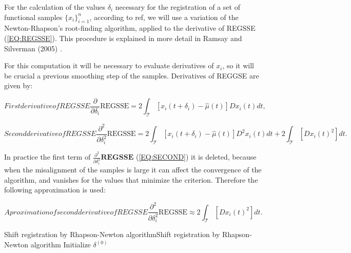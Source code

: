 

For the calculation of the values $\delta_i$ necessary for the registration of a
set of functional samples $\{x_i\}_{i=1}^{n}$, according to ref{},
we will use a variation of the Newton-Rhapson's root-finding algorithm, applied
to the derivative of REGSSE (\ref{EQ:REGSSE}). This procedure is explained in more detail
in Ramsay and Silverman (2005) \cite{Ramsay2005}.

For this computation it will be necessary to evaluate derivatives of
$x_i$, so it will be crucial a previous smoothing step of the samples.
Derivatives of REGGSE are given by:

\begin{equation}[EQ:FIRST]{First derivative of REGSSE}
\frac{\partial}{\partial \delta_i} \text{REGSSE} = 2 \int_{\mathcal{T}}
\left [ x_i(t + \delta_i) - \hat \mu(t) \right ] Dx_i(t) dt,
\end{equation}

\begin{equation}[EQ:SECOND]{Second derivative of REGSSE}
\frac{\partial^2}{\partial \delta^2_i} \text{REGSSE} = 2
\int_{\mathcal{T}} \left [ x_i(t + \delta_i) - \hat \mu(t) \right ]
D^2x_i(t) dt + 2 \int_{\mathcal{T}} \left [  Dx_i(t)^2 \right ]  dt.
\end{equation}

In practice the first term of $\frac{\partial^2}{\partial \delta^2_i}\textbf{REGSSE}$
(\ref{EQ:SECOND}) it is deleted, because when the misalignment of the samples is large it
can affect the convergence of the algorithm, and vanishes for the values that
minimize the criterion. Therefore the following approximation is used:

\begin{equation}[]{Aproximation of second derivative of REGSSE}
\frac{\partial^2}{\partial \delta^2_i} \text{REGSSE} \approx  
2 \int_{\mathcal{T}} \left [  Dx_i(t)^2 \right ]  dt.
\end{equation}

\begin{algorithmN}{Shift registration by Rhapson-Newton algorithm}{Shift registration by Rhapson-Newton algorithm}
	\BlankLine
	Initialize $\delta^{(0)}$ \;
	
\end{algorithmN}

